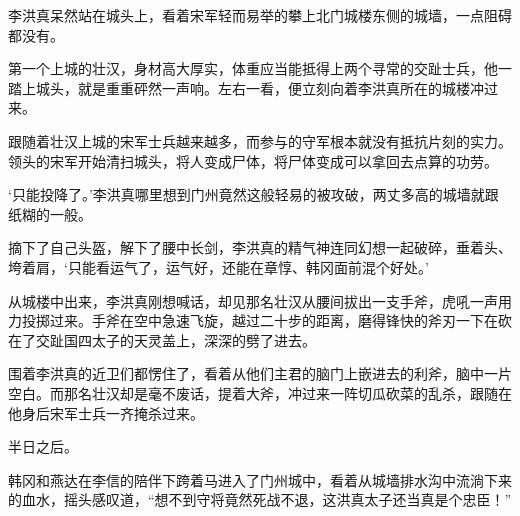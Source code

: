 李洪真呆然站在城头上，看着宋军轻而易举的攀上北门城楼东侧的城墙，一点阻碍都没有。

第一个上城的壮汉，身材高大厚实，体重应当能抵得上两个寻常的交趾士兵，他一踏上城头，就是重重砰然一声响。左右一看，便立刻向着李洪真所在的城楼冲过来。

跟随着壮汉上城的宋军士兵越来越多，而参与的守军根本就没有抵抗片刻的实力。领头的宋军开始清扫城头，将人变成尸体，将尸体变成可以拿回去点算的功劳。

‘只能投降了。’李洪真哪里想到门州竟然这般轻易的被攻破，两丈多高的城墙就跟纸糊的一般。

摘下了自己头盔，解下了腰中长剑，李洪真的精气神连同幻想一起破碎，垂着头、垮着肩，‘只能看运气了，运气好，还能在章惇、韩冈面前混个好处。’

从城楼中出来，李洪真刚想喊话，却见那名壮汉从腰间拔出一支手斧，虎吼一声用力投掷过来。手斧在空中急速飞旋，越过二十步的距离，磨得锋快的斧刃一下在砍在了交趾国四太子的天灵盖上，深深的劈了进去。

围着李洪真的近卫们都愣住了，看着从他们主君的脑门上嵌进去的利斧，脑中一片空白。而那名壮汉却是毫不废话，提着大斧，冲过来一阵切瓜砍菜的乱杀，跟随在他身后宋军士兵一齐掩杀过来。

半日之后。

韩冈和燕达在李信的陪伴下跨着马进入了门州城中，看着从城墙排水沟中流淌下来的血水，摇头感叹道，“想不到守将竟然死战不退，这洪真太子还当真是个忠臣！”

